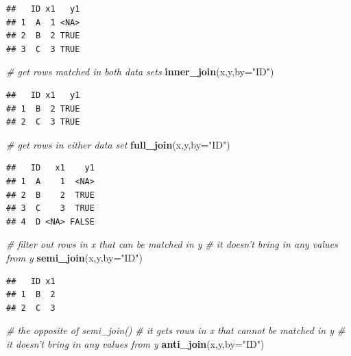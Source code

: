 \documentclass[12pt,]{krantz}
\newenvironment{Shaded}{\begin{snugshade}}{\end{snugshade}}
\newcommand{\KeywordTok}[1]{\textcolor[rgb]{0.13,0.29,0.53}{\textbf{#1}}}
\newcommand{\DataTypeTok}[1]{\textcolor[rgb]{0.13,0.29,0.53}{#1}}
\newcommand{\StringTok}[1]{\textcolor[rgb]{0.31,0.60,0.02}{#1}}
\newcommand{\CommentTok}[1]{\textcolor[rgb]{0.56,0.35,0.01}{\textit{#1}}}
\newcommand{\NormalTok}[1]{#1}
\theoremstyle{definition}
\theoremstyle{definition}
\theoremstyle{definition}
\theoremstyle{remark}
\begin{document}
\begin{verbatim}
##   ID x1   y1
## 1  A  1 <NA>
## 2  B  2 TRUE
## 3  C  3 TRUE
\end{verbatim}

\begin{Shaded}
\begin{Highlighting}[]
\CommentTok{# get rows matched in both data sets}
\KeywordTok{inner_join}\NormalTok{(x,y,}\DataTypeTok{by=}\StringTok{"ID"}\NormalTok{)}
\end{Highlighting}
\end{Shaded}

\begin{verbatim}
##   ID x1   y1
## 1  B  2 TRUE
## 2  C  3 TRUE
\end{verbatim}

\begin{Shaded}
\begin{Highlighting}[]
\CommentTok{# get rows in either data set}
\KeywordTok{full_join}\NormalTok{(x,y,}\DataTypeTok{by=}\StringTok{"ID"}\NormalTok{)}
\end{Highlighting}
\end{Shaded}

\begin{verbatim}
##   ID   x1    y1
## 1  A    1  <NA>
## 2  B    2  TRUE
## 3  C    3  TRUE
## 4  D <NA> FALSE
\end{verbatim}

\begin{Shaded}
\begin{Highlighting}[]
\CommentTok{# filter out rows in x that can be matched in y }
\CommentTok{# it doesn't bring in any values from y }
\KeywordTok{semi_join}\NormalTok{(x,y,}\DataTypeTok{by=}\StringTok{"ID"}\NormalTok{)}
\end{Highlighting}
\end{Shaded}

\begin{verbatim}
##   ID x1
## 1  B  2
## 2  C  3
\end{verbatim}

\begin{Shaded}
\begin{Highlighting}[]
\CommentTok{# the opposite of  semi_join()}
\CommentTok{# it gets rows in x that cannot be matched in y}
\CommentTok{# it doesn't bring in any values from y}
\KeywordTok{anti_join}\NormalTok{(x,y,}\DataTypeTok{by=}\StringTok{"ID"}\NormalTok{)}
\end{Highlighting}
\end{Shaded}
\end{document}
